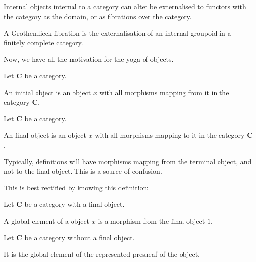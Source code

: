 Internal objects internal to a category can alter be externalised to functors with the category as the domain, or as fibrations over the category.

\begin{definition}
	\label{pseudodefinition-internal-groupoids-externalised}
	A Grothendieck fibration is the externalisation of an
    internal groupoid in a finitely complete category.
\end{definition}

Now, we have all the motivation for the yoga of objects.

\begin{definition}
	\label{definition-initial-object}
	Let $\mathbf{C}$ be a category.

	An initial object is an object $x$ with all morphisms mapping from it in the category $\mathbf{C}$.
\end{definition}

\begin{definition}
	\label{definition-final-object}
	Let $\mathbf{C}$ be a category.

	An final object is an object $x$ with all morphisms mapping to it in the category $\mathbf{C}$.
\end{definition}

Typically, definitions will have morphisms mapping from the terminal object, and not to the final object. This is a source of confusion.

This is best rectified by knowing this definition:

\begin{definition}
	\label{definition-global-element-final}
	Let $\mathbf{C}$ be a category with a final object.

    A global element of a object $x$ is a morphism from the final object $1$. 
\end{definition}

\begin{definition}
    \label{definition-global-element-presheaf}
	Let $\mathbf{C}$ be a category without a final object.

	It is the global element of the represented presheaf of the object.
\end{definition}

